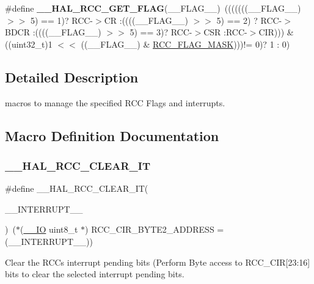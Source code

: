 \begin{DoxyCompactItemize}
\#define {\bfseries \+\_\+\+\_\+\+H\+A\+L\+\_\+\+R\+C\+C\+\_\+\+G\+E\+T\+\_\+\+F\+L\+AG}(\+\_\+\+\_\+\+F\+L\+A\+G\+\_\+\+\_\+)~(((((((\+\_\+\+\_\+\+F\+L\+A\+G\+\_\+\+\_\+) $>$$>$ 5) == 1)? R\+CC-\/$>$CR \+:((((\+\_\+\+\_\+\+F\+L\+A\+G\+\_\+\+\_\+) $>$$>$ 5) == 2) ? R\+CC-\/$>$B\+D\+CR \+:((((\+\_\+\+\_\+\+F\+L\+A\+G\+\_\+\+\_\+) $>$$>$ 5) == 3)? R\+CC-\/$>$C\+SR \+:R\+CC-\/$>$C\+IR))) \& ((uint32\+\_\+t)1 $<$$<$ ((\+\_\+\+\_\+\+F\+L\+A\+G\+\_\+\+\_\+) \& \mbox{\hyperlink{group___r_c_c___flags___interrupts___management_ga80017c6bf8a5c6f53a1a21bb8db93a82}{R\+C\+C\+\_\+\+F\+L\+A\+G\+\_\+\+M\+A\+SK}})))!= 0)? 1 \+: 0)
\end{DoxyCompactItemize}


\subsection{Detailed Description}
macros to manage the specified R\+CC Flags and interrupts. 



\subsection{Macro Definition Documentation}
\mbox{\label{group___r_c_c___flags___interrupts___management_ga9d8ab157f58045b8daf8136bee54f139}} 
\subsubsection{\texorpdfstring{\_\_HAL\_RCC\_CLEAR\_IT}{\_\_HAL\_RCC\_CLEAR\_IT}}
{\footnotesize\ttfamily \#define \+\_\+\+\_\+\+H\+A\+L\+\_\+\+R\+C\+C\+\_\+\+C\+L\+E\+A\+R\+\_\+\+IT(\begin{DoxyParamCaption}\item[{}]{\+\_\+\+\_\+\+I\+N\+T\+E\+R\+R\+U\+P\+T\+\_\+\+\_\+ }\end{DoxyParamCaption})~($\ast$(\mbox{\hyperlink{core__sc300_8h_aec43007d9998a0a0e01faede4133d6be}{\+\_\+\+\_\+\+IO}} uint8\+\_\+t $\ast$) R\+C\+C\+\_\+\+C\+I\+R\+\_\+\+B\+Y\+T\+E2\+\_\+\+A\+D\+D\+R\+E\+SS = (\+\_\+\+\_\+\+I\+N\+T\+E\+R\+R\+U\+P\+T\+\_\+\+\_\+))}



Clear the R\+CC\textquotesingle{}s interrupt pending bits (Perform Byte access to R\+C\+C\+\_\+\+C\+IR\mbox{[}23\+:16\mbox{]} bits to clear the selected interrupt pending bits. 


